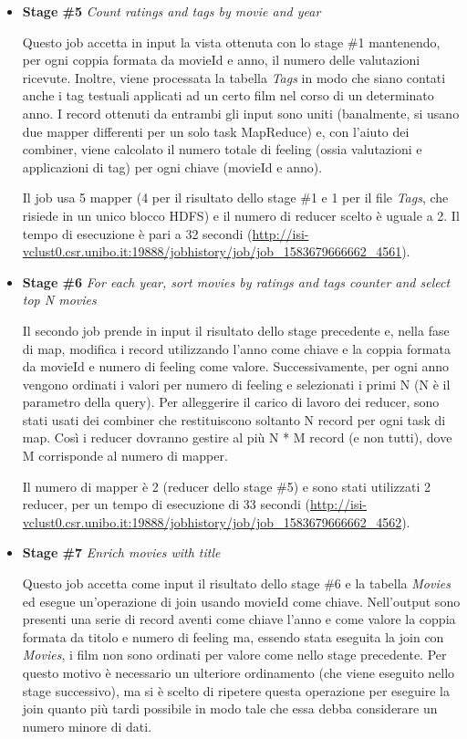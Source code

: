 \documentclass[10pt]{article}
\begin{document}
\begin{itemize}
\item \textbf{Stage \#5} \textit{Count ratings and tags by movie and year}

Questo job accetta in input la vista ottenuta con lo stage \#1 mantenendo, per ogni coppia formata da movieId e anno, il numero delle valutazioni ricevute. Inoltre, viene processata la tabella \textit{Tags} in modo che siano contati anche i tag testuali applicati ad un certo film nel corso di un determinato anno. I record ottenuti da entrambi gli input sono uniti (banalmente, si usano due mapper differenti per un solo task MapReduce) e, con l'aiuto dei combiner, viene calcolato il numero totale di feeling (ossia valutazioni e applicazioni di tag) per ogni chiave (movieId e anno).

Il job usa 5 mapper (4 per il risultato dello stage \#1 e 1 per il file \textit{Tags}, che risiede in un unico blocco HDFS) e il numero di reducer scelto è uguale a 2. Il tempo di esecuzione è pari a 32 secondi (\url{http://isi-vclust0.csr.unibo.it:19888/jobhistory/job/job_1583679666662_4561}).

\item \textbf{Stage \#6} \textit{For each year, sort movies by ratings and tags counter and select top N movies}

Il secondo job prende in input il risultato dello stage precedente e, nella fase di map, modifica i record utilizzando l'anno come chiave e la coppia formata da movieId e numero di feeling come valore. Successivamente, per ogni anno vengono ordinati i valori per numero di feeling e selezionati i primi N (N è il parametro della query). Per alleggerire il carico di lavoro dei reducer, sono stati usati dei combiner che restituiscono soltanto N record per ogni task di map. Così i reducer dovranno gestire al più N * M record (e non tutti), dove M corrisponde al numero di mapper.

Il numero di mapper è 2 (reducer dello stage \#5) e sono stati utilizzati 2 reducer, per un tempo di esecuzione di 33 secondi (\url{http://isi-vclust0.csr.unibo.it:19888/jobhistory/job/job_1583679666662_4562}).

\item \textbf{Stage \#7} \textit{Enrich movies with title}

Questo job accetta come input il risultato dello stage \#6 e la tabella \textit{Movies} ed esegue un'operazione di join usando movieId come chiave. Nell'output sono presenti una serie di record aventi come chiave l'anno e come valore la coppia formata da titolo e numero di feeling ma, essendo stata eseguita la join con \textit{Movies}, i film non sono ordinati per valore come nello stage precedente. Per questo motivo è necessario un ulteriore ordinamento (che viene eseguito nello stage successivo), ma si è scelto di ripetere questa operazione per eseguire la join quanto più tardi possibile in modo tale che essa debba considerare un numero minore di dati.


\end{itemize}
\end{document}
